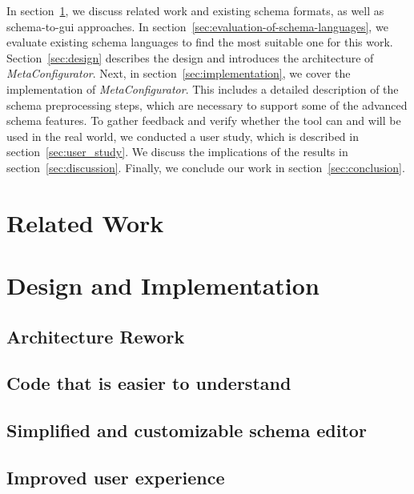 \documentclass[lettersize,journal]{IEEEtran}
\newcommand{\toolname}{\textit{MetaConfigurator}}
\begin{document}
 In section~\ref{sec:research}, we discuss related work and existing schema formats, as well as schema-to-gui approaches.
 In section~\ref{sec:evaluation-of-schema-languages}, we evaluate existing schema languages to find the most suitable one for this work.
 Section~\ref{sec:design} describes the design and introduces the architecture of \toolname{}.
 Next, in section~\ref{sec:implementation}, we cover the implementation of \toolname{}.
 This includes a detailed description of the schema preprocessing steps, which are necessary to support some of the advanced schema features.
 To gather feedback and verify whether the tool can and will be used in the real world, we conducted a user study, which is described in section~\ref{sec:user_study}.
 We discuss the implications of the results in section~\ref{sec:discussion}.
 Finally, we conclude our work in section~\ref{sec:conclusion}.


 \section{Related Work}\label{sec:research}
 


 \section{Design and Implementation}\label{sec:design_and_implementation}
 

 \subsection{Architecture Rework}\label{subsec:architecture_rework}
 
 

 \subsection{Code that is easier to understand}\label{subsec:maintainability}
 
 
 
 
 \subsection{Simplified and customizable schema editor}\label{subsec:better_schema_editor}
 

 
 \subsection{Improved user experience}\label{subsec:better_schema_editor}
 
\end{document}
